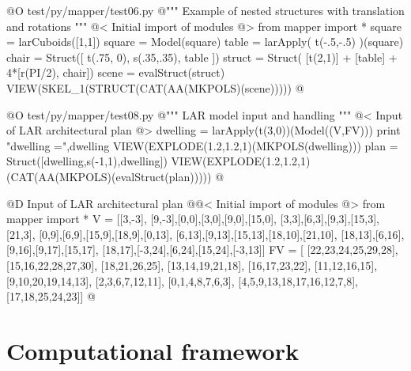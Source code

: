 \documentclass[11pt,oneside]{article}	%
\begin{document}
@O test/py/mapper/test06.py
@{""" Example of nested structures with translation and rotations """
@< Initial import of modules @>
from mapper import *
square = larCuboids([1,1])
square = Model(square)
table = larApply( t(-.5,-.5) )(square)
chair = Struct([ t(.75, 0), s(.35,.35), table ])
struct = Struct( [t(2,1)] + [table] + 4*[r(PI/2), chair])
scene = evalStruct(struct)
VIEW(SKEL_1(STRUCT(CAT(AA(MKPOLS)(scene)))))
@}


@O test/py/mapper/test08.py
@{""" LAR model input and handling """
@< Input of LAR architectural plan @>
dwelling = larApply(t(3,0))(Model((V,FV)))
print "\n dwelling =",dwelling
VIEW(EXPLODE(1.2,1.2,1)(MKPOLS(dwelling)))
plan = Struct([dwelling,s(-1,1),dwelling])
VIEW(EXPLODE(1.2,1.2,1)(CAT(AA(MKPOLS)(evalStruct(plan)))))
@}



@D Input of LAR architectural plan
@{@< Initial import of modules @>
from mapper import *
V = [[3,-3],
[9,-3],[0,0],[3,0],[9,0],[15,0],
[3,3],[6,3],[9,3],[15,3],[21,3], 
[0,9],[6,9],[15,9],[18,9],[0,13],
[6,13],[9,13],[15,13],[18,10],[21,10], 
[18,13],[6,16],[9,16],[9,17],[15,17],
[18,17],[-3,24],[6,24],[15,24],[-3,13]]
FV = [
[22,23,24,25,29,28], [15,16,22,28,27,30], [18,21,26,25], 
[13,14,19,21,18], [16,17,23,22], [11,12,16,15],
[9,10,20,19,14,13], [2,3,6,7,12,11], [0,1,4,8,7,6,3],
[4,5,9,13,18,17,16,12,7,8],[17,18,25,24,23]]
@}



\section{Computational framework}
\end{document}
